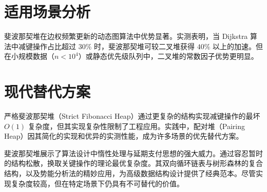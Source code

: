 \section{适用场景分析}
斐波那契堆在边权频繁更新的动态图算法中优势显著。实测表明，当 Dijkstra 算法中减键操作占比超过 $30\%$ 时，斐波那契堆可较二叉堆获得 $40\%$ 以上的加速。但在小规模数据（$n < 10^4$）或静态优先级队列中，二叉堆的常数因子优势更明显。\par
\section{现代替代方案}
严格斐波那契堆（Strict Fibonacci Heap）通过更复杂的结构实现减键操作的最坏 $O(1)$ 复杂度，但其实现复杂性限制了工程应用。实践中，配对堆（Pairing Heap）因其简化的实现和优异的实测性能，成为许多场景的优先替代方案。\par
斐波那契堆展示了算法设计中惰性处理与延期支付思想的强大威力。通过容忍暂时的结构松散，换取关键操作的理论最优复杂度。其双向循环链表与树形森林的复合结构，以及势能分析法的精妙应用，为高级数据结构设计提供了经典范本。尽管实现复杂度较高，但在特定场景下仍具有不可替代的价值。\par

